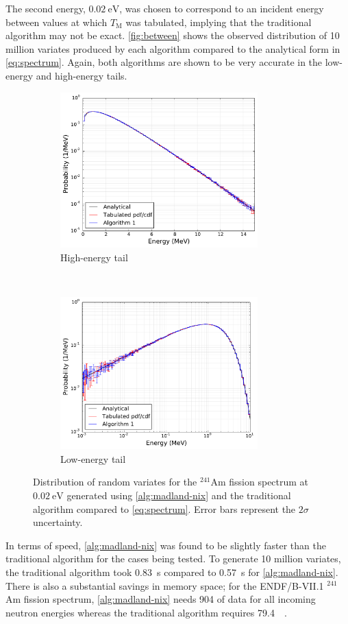 \documentclass[3p,fleqn]{elsarticle}
\newcommand{\tmax}{T_{\mathrm{M}}}
\begin{document}
The second energy, $\SI{0.02}{\electronvolt}$, was chosen to correspond to an
incident energy between values at which $\tmax$ was tabulated, implying that
the traditional algorithm may not be exact. \autoref{fig:between} shows the
observed distribution of 10 million variates produced by each algorithm
compared to the analytical form in \autoref{eq:spectrum}. Again, both
algorithms are shown to be very accurate in the low-energy and high-energy
tails.
\begin{figure}[H]
  \centering
  \begin{subfigure}[t]{0.45\textwidth}
    \includegraphics[width=3.0in]{images/spectrum-between-semilogy.pdf}
    \caption{High-energy tail}
  \end{subfigure}
  ~
  \begin{subfigure}[t]{0.45\textwidth}
    \includegraphics[width=3.0in]{images/spectrum-between-loglog.pdf}
    \caption{Low-energy tail}
  \end{subfigure}
  \caption{Distribution of random variates for the $^{241}$Am fission spectrum
    at $\SI{0.02}{\electronvolt}$ generated using \autoref{alg:madland-nix} and
    the traditional algorithm compared to \autoref{eq:spectrum}. Error bars
    represent the $2\sigma$ uncertainty.}
  \label{fig:between}
\end{figure}

In terms of speed, \autoref{alg:madland-nix} was found to be slightly faster
than the traditional algorithm for the cases being tested. To generate 10
million variates, the traditional algorithm took \SI{0.83}{\second} compared to
\SI{0.57}{\second} for \autoref{alg:madland-nix}. There is also a substantial
savings in memory space; for the ENDF/B-VII.1 $^{241}$Am fission spectrum,
\autoref{alg:madland-nix} needs \SI{904}{\byte} of data for all incoming
neutron energies whereas the traditional algorithm requires
\SI{79.4}{\kilo\byte}.
\end{document}
